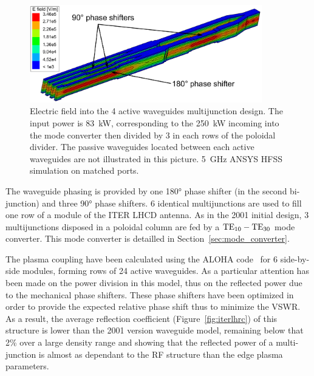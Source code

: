 \begin{figure}[h]
	\centering{}\includegraphics[width=0.9\textwidth]{figures/chap3/ITER_antenna/LH4ITER_MJ_4awg}
	\caption{Electric field into the 4 active waveguides multijunction design.
		The input power is 83~kW, corresponding to the 250~kW incoming
		into the mode converter then divided by 3 in each rows of the poloidal
		divider. The passive waveguides located between each active waveguides
		are not illustrated in this picture. 5~GHz ANSYS HFSS simulation
		on matched ports.}
	\label{fig:Illustration_4awg_design} 
\end{figure}

The waveguide phasing is provided by one 180\si{\degree} phase shifter (in the second bi-junction) and three 90\si{\degree} phase shifters. 6 identical multijunctions are used to fill one row of a module of the ITER LHCD antenna. As in the 2001 initial design, 3 multijunctions disposed in a poloidal column are fed by a ${\mathrm{TE}}_{10}-{\mathrm{TE}}_{30}$ mode converter. This mode converter is detailled in Section~\ref{sec:mode_converter}.

The plasma coupling have been calculated using the ALOHA code~ for 6 side-by-side modules, forming rows of 24 active waveguides. As a particular attention has been made on the power division in this model, thus on the reflected power due to the mechanical phase shifters. These phase shifters have been optimized in order to provide the expected relative phase shift thus to minimize the VSWR. As a result, the average reflection coefficient (Figure~\ref{fig:iterlhrc}) of this structure is lower than the 2001 version waveguide model, remaining below that 2\% over a large density range and showing that the reflected power of a multi-junction is almost as dependant to the RF structure than the edge plasma parameters.

